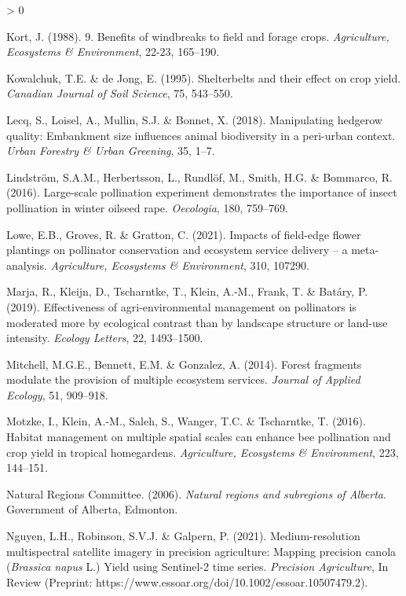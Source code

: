 \documentclass[]{elsarticle} %
\newlength{\cslhangindent}
\newenvironment{CSLReferences}[2] %
 {%
  \setlength{\parindent}{0pt}
  \ifodd #1 \everypar{\setlength{\hangindent}{\cslhangindent}}\ignorespaces\fi
  \ifnum #2 > 0
  \setlength{\parskip}{#2\baselineskip}
  \fi
 }%
 {}
\begin{document}
\begin{CSLReferences}{1}{0}
\leavevmode\hypertarget{ref-kort1988}{}%
Kort, J. (1988). 9. Benefits of windbreaks to field and forage crops. \emph{Agriculture, Ecosystems {\&} Environment}, 22-23, 165--190.

\leavevmode\hypertarget{ref-kowalchuk1995}{}%
Kowalchuk, T.E. \& de Jong, E. (1995). Shelterbelts and their effect on crop yield. \emph{Canadian Journal of Soil Science}, 75, 543--550.

\leavevmode\hypertarget{ref-lecq2018}{}%
Lecq, S., Loisel, A., Mullin, S.J. \& Bonnet, X. (2018). Manipulating hedgerow quality: Embankment size influences animal biodiversity in a peri-urban context. \emph{Urban Forestry {\&} Urban Greening}, 35, 1--7.

\leavevmode\hypertarget{ref-lindstrom2016}{}%
Lindström, S.A.M., Herbertsson, L., Rundlöf, M., Smith, H.G. \& Bommarco, R. (2016). Large-scale pollination experiment demonstrates the importance of insect pollination in winter oilseed rape. \emph{Oecologia}, 180, 759--769.

\leavevmode\hypertarget{ref-lowe2021}{}%
Lowe, E.B., Groves, R. \& Gratton, C. (2021). Impacts of field-edge flower plantings on pollinator conservation and ecosystem service delivery -- a meta-analysis. \emph{Agriculture, Ecosystems {\&} Environment}, 310, 107290.

\leavevmode\hypertarget{ref-marja2019}{}%
Marja, R., Kleijn, D., Tscharntke, T., Klein, A.-M., Frank, T. \& Batáry, P. (2019). Effectiveness of agri-environmental management on pollinators is moderated more by ecological contrast than by landscape structure or land-use intensity. \emph{Ecology Letters}, 22, 1493--1500.

\leavevmode\hypertarget{ref-mitchell2014}{}%
Mitchell, M.G.E., Bennett, E.M. \& Gonzalez, A. (2014). Forest fragments modulate the provision of multiple ecosystem services. \emph{Journal of Applied Ecology}, 51, 909--918.

\leavevmode\hypertarget{ref-motzke2016}{}%
Motzke, I., Klein, A.-M., Saleh, S., Wanger, T.C. \& Tscharntke, T. (2016). Habitat management on multiple spatial scales can enhance bee pollination and crop yield in tropical homegardens. \emph{Agriculture, Ecosystems \& Environment}, 223, 144--151.

\leavevmode\hypertarget{ref-ABRegions2006}{}%
Natural Regions Committee. (2006). \emph{Natural regions and subregions of {Alberta}}. Government of Alberta, Edmonton.

\leavevmode\hypertarget{ref-nguyen2021}{}%
Nguyen, L.H., Robinson, S.V.J. \& Galpern, P. (2021). Medium-resolution multispectral satellite imagery in precision agriculture: Mapping precision canola ({\emph{Brassica napus}} {L.}) Yield using {Sentinel-2} time series. \emph{Precision Agriculture}, In Review (Preprint: https://www.essoar.org/doi/10.1002/essoar.10507479.2).


\end{CSLReferences}
\end{document}

